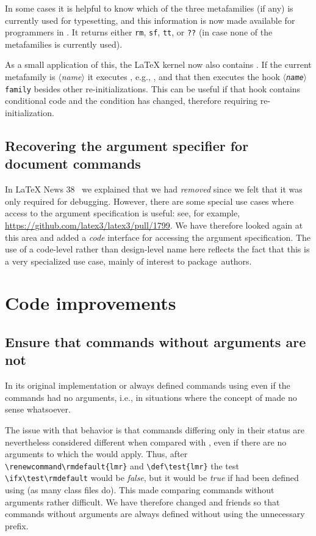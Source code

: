 \documentclass{ltnews}
\providecommand\meta[1]{$\langle$\textrm{\itshape#1}$\rangle$}
\begin{document}
In some cases it is helpful to know which of the three metafamilies
(if any) is currently used for typesetting, and this information is
now made available for programmers in . It
returns either \texttt{rm}, \texttt{sf}, \texttt{tt}, or \texttt{??}
(in case none of the metafamilies is currently used).

As a small application of this, the \LaTeX{} kernel now also contains
. If the current metafamily is \meta{name} it
executes \cs{\meta{name}family}, e.g., , and that then
executes the hook \texttt{\meta{name}family} besides other
re-initializations. This can be useful if that hook contains
conditional code and the condition has changed, therefore requiring
re-initialization.

\subsection{Recovering the argument specifier for document commands}

In \LaTeX{} News 38~\cite{42:ltnews38} we explained that we had
\emph{removed}  since we felt that it
was only required for debugging. However, there are some special
use cases where access to the argument specification is useful: see,
for example, \url{https://github.com/latex3/latex3/pull/1799}. We have
therefore looked again at this area and added a \emph{code} interface
 for accessing the argument
specification. The use of a code-level rather than design-level name
here reflects the fact that this is a very specialized use case,
mainly of interest to package~authors.

\section{Code improvements}

\subsection{Ensure that commands without arguments are not }

In its original implementation  or 
always defined commands using  even if the commands
had no arguments, i.e., in situations where the concept of 
made no sense whatsoever.

The issue with that behavior is that commands differing only in their
 status are nevertheless considered different when compared
with , even if there are no arguments to which the 
would apply. Thus, after \verb=\renewcommand\rmdefault{lmr}= and
\verb=\def\test{lmr}= the test \verb=\ifx\test\rmdefault= would be
\emph{false}, but it would be \emph{true} if  had been
defined using  (as many class files do).  This made comparing
commands without arguments rather difficult.
%
We have therefore changed  and friends so that commands
without arguments are always defined without using the unnecessary
 prefix.
\end{document}
